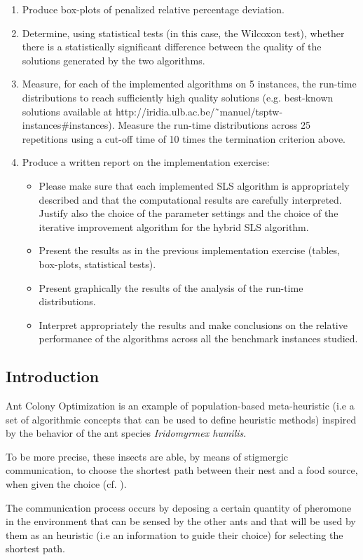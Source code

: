 \begin{homeworkProblem}
\begin{enumerate}
\item Produce box-plots of penalized relative percentage deviation.
\item Determine, using statistical tests (in this case, the Wilcoxon test), whether there is a statistically significant difference between the quality of the solutions generated by the two algorithms.
\item Measure, for each of the implemented algorithms on 5 instances, the run-time distributions to reach sufficiently high quality solutions (e.g. best-known solutions available at http://iridia.ulb.ac.be/˜manuel/tsptw-instances\#instances).
Measure the run-time distributions across 25 repetitions using a cut-off time of 10 times the termination criterion above.
\item Produce a written report on the implementation exercise:
\begin{itemize}
  \item Please make sure that each implemented SLS algorithm is appropriately described and that the computational results are carefully interpreted. Justify also the choice of the parameter settings and the choice
of the iterative improvement algorithm for the hybrid SLS algorithm.
  \item Present the results as in the previous implementation exercise (tables, box-plots, statistical tests).
  \item Present graphically the results of the analysis of the run-time distributions.
  \item Interpret appropriately the results and make conclusions on the relative performance of the algorithms across all the benchmark instances studied.
\end{itemize}
\end{enumerate}

\subsection{Introduction} \label{sec:introACO}
Ant Colony Optimization is an example of population-based meta-heuristic (i.e a set of algorithmic concepts that can be used to define heuristic methods) inspired by the behavior of the ant species \emph{Iridomyrmex humilis}.

To be more precise, these insects are able, by means of stigmergic communication, to choose the shortest path between their nest and a food source, when given the choice (cf. \cite{deneubourg1990self}).

The communication process occurs by deposing a certain quantity of pheromone in the environment that can be sensed by the other ants and that will be used by them as an heuristic (i.e an information to guide their choice) for selecting the shortest path.


\end{homeworkProblem}
